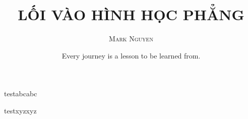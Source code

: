 \documentclass[11pt]{book}
\title{\textbf{\Huge LỐI VÀO HÌNH HỌC PHẲNG}}
\author{\LARGE \textsc{Mark Nguyen}}
\date{\sffamily Every journey is a lesson to be learned from.}
\begin{document}
    \frontmatter

    \maketitle

    testabcabc

    \newpage

    testxyzxyz
\end{document}
